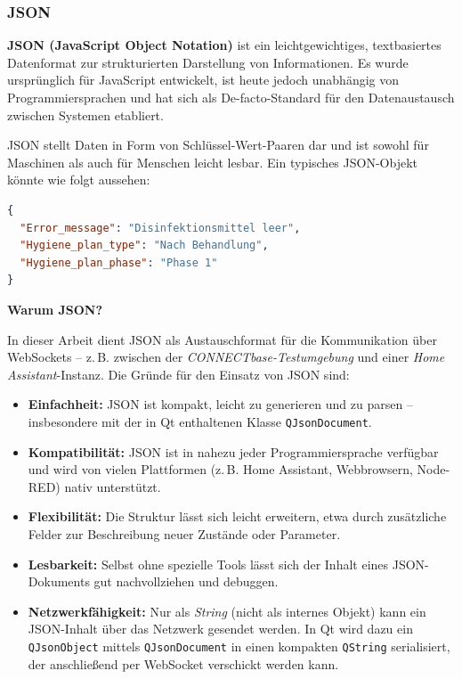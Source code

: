 \subsubsection{JSON}

\textbf{JSON (JavaScript Object Notation)} ist ein leichtgewichtiges, textbasiertes Datenformat zur strukturierten Darstellung von Informationen. Es wurde ursprünglich für JavaScript entwickelt, ist heute jedoch unabhängig von Programmiersprachen und hat sich als De-facto-Standard für den Datenaustausch zwischen Systemen etabliert.

JSON stellt Daten in Form von Schlüssel-Wert-Paaren dar und ist sowohl für Maschinen als auch für Menschen leicht lesbar. Ein typisches JSON-Objekt könnte wie folgt aussehen:

\begin{lstlisting}[language=json,caption={Beispiel für ein JSON-Objekt},label={lst:json-example}]
{
  "Error_message": "Disinfektionsmittel leer",
  "Hygiene_plan_type": "Nach Behandlung",
  "Hygiene_plan_phase": "Phase 1"
}
\end{lstlisting}

\textbf{Warum JSON?} 

In dieser Arbeit dient JSON als Austauschformat für die Kommunikation über WebSockets – z.\,B. zwischen der \textit{CONNECTbase-Testumgebung} und einer \textit{Home Assistant}-Instanz. Die Gründe für den Einsatz von JSON sind:

\begin{itemize}
  \item \textbf{Einfachheit:} JSON ist kompakt, leicht zu generieren und zu parsen – insbesondere mit der in Qt enthaltenen Klasse \texttt{QJsonDocument}.\\
  \item \textbf{Kompatibilität:} JSON ist in nahezu jeder Programmiersprache verfügbar und wird von vielen Plattformen (z.\,B. Home Assistant, Webbrowsern, Node-RED) nativ unterstützt.\\
  \item \textbf{Flexibilität:} Die Struktur lässt sich leicht erweitern, etwa durch zusätzliche Felder zur Beschreibung neuer Zustände oder Parameter.\\
  \item \textbf{Lesbarkeit:} Selbst ohne spezielle Tools lässt sich der Inhalt eines JSON-Dokuments gut nachvollziehen und debuggen.\\
  \item \textbf{Netzwerkfähigkeit:} Nur als \textit{String} (nicht als internes Objekt) kann ein JSON-Inhalt über das Netzwerk gesendet werden. In Qt wird dazu ein \texttt{QJsonObject} mittels \texttt{QJsonDocument} in einen kompakten \texttt{QString} serialisiert, der anschließend per WebSocket verschickt werden kann.
\end{itemize}

